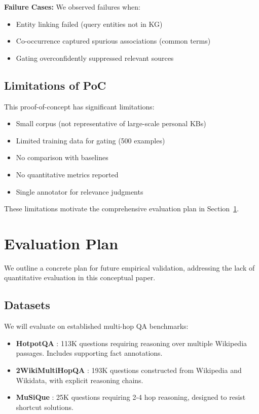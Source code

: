 \documentclass[11pt,a4paper]{article}
\begin{document}
\textbf{Failure Cases:} We observed failures when:
\begin{itemize}
    \item Entity linking failed (query entities not in KG)
    \item Co-occurrence captured spurious associations (common terms)
    \item Gating overconfidently suppressed relevant sources
\end{itemize}

\subsection{Limitations of PoC}

This proof-of-concept has significant limitations:
\begin{itemize}
    \item Small corpus (not representative of large-scale personal KBs)
    \item Limited training data for gating (500 examples)
    \item No comparison with baselines
    \item No quantitative metrics reported
    \item Single annotator for relevance judgments
\end{itemize}

These limitations motivate the comprehensive evaluation plan in Section~\ref{sec:evaluation_plan}.

\section{Evaluation Plan}
\label{sec:evaluation_plan}

We outline a concrete plan for future empirical validation, addressing the lack of quantitative evaluation in this conceptual paper.

\subsection{Datasets}

We will evaluate on established multi-hop QA benchmarks:

\begin{itemize}
    \item \textbf{HotpotQA} \citep{yang2018hotpotqa}: 113K questions requiring reasoning over multiple Wikipedia passages. Includes supporting fact annotations.
    
    \item \textbf{2WikiMultiHopQA} \citep{ho2020constructing}: 193K questions constructed from Wikipedia and Wikidata, with explicit reasoning chains.
    
    \item \textbf{MuSiQue} \citep{trivedi2022musique}: 25K questions requiring 2-4 hop reasoning, designed to resist shortcut solutions.
\end{itemize}
\end{document}
